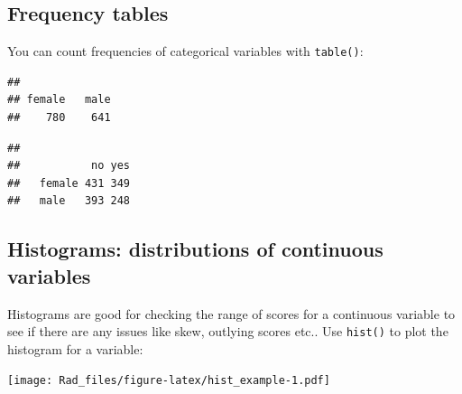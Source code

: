 \documentclass[
]{book}
\newenvironment{Shaded}{\begin{snugshade}}{\end{snugshade}}
\newcommand{\FunctionTok}[1]{\textcolor[rgb]{0.00,0.00,0.00}{#1}}
\newcommand{\NormalTok}[1]{#1}
\newcommand{\SpecialCharTok}[1]{\textcolor[rgb]{0.00,0.00,0.00}{#1}}
\begin{document}
\hypertarget{frequency-tables}{%
\subsection{Frequency tables}\label{frequency-tables}}

You can count frequencies of categorical variables with
\texttt{table()}:

\begin{Shaded}
\end{Shaded}

\begin{verbatim}
## 
## female   male 
##    780    641
\end{verbatim}

\begin{Shaded}
\end{Shaded}

\begin{verbatim}
##         
##           no yes
##   female 431 349
##   male   393 248
\end{verbatim}

\hypertarget{histograms-distributions-of-continuous-variables}{%
\subsection{Histograms: distributions of continuous variables}\label{histograms-distributions-of-continuous-variables}}

Histograms are good for checking the range of scores
for a continuous variable to see if there are any
issues like skew, outlying scores etc.. Use \texttt{hist()}
to plot the histogram for a variable:

\begin{Shaded}
\end{Shaded}

\texttt{[image: Rad\_files/figure-latex/hist\_example-1.pdf]}
\end{document}
